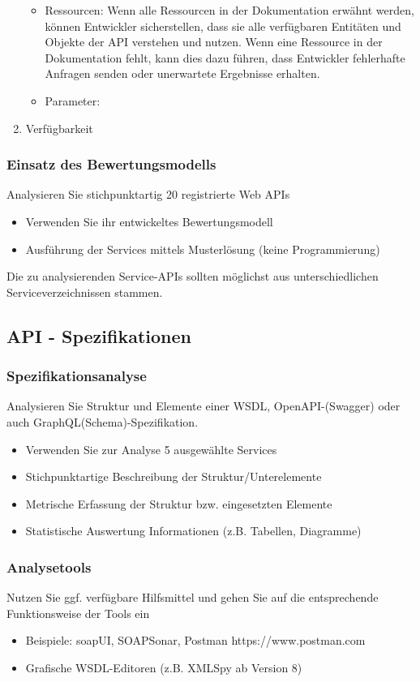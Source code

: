 \documentclass[notitlepage, hidelinks]{article}
\begin{document}
\begin{enumerate}
\begin{itemize}
\item Ressourcen: Wenn alle Ressourcen in der Dokumentation erwähnt werden, können Entwickler sicherstellen, dass sie alle verfügbaren Entitäten und Objekte der API verstehen und nutzen. Wenn eine Ressource in der Dokumentation fehlt, kann dies dazu führen, dass Entwickler fehlerhafte Anfragen senden oder unerwartete Ergebnisse erhalten.
\item Parameter: 
\end{itemize}
\item Verfügbarkeit
\end{enumerate}


\subsubsection{Einsatz des Bewertungsmodells}
Analysieren Sie stichpunktartig 20 registrierte Web APIs
\begin{itemize}
\item Verwenden Sie ihr entwickeltes Bewertungsmodell
\item Ausführung der Services mittels Musterlösung (keine Programmierung)
\end{itemize}
Die zu analysierenden Service-APIs sollten möglichst aus unterschiedlichen Serviceverzeichnissen stammen.

\subsection{API - Spezifikationen}
\subsubsection{Spezifikationsanalyse}
Analysieren Sie Struktur und Elemente einer WSDL, OpenAPI-(Swagger) oder auch GraphQL(Schema)-Spezifikation.
\begin{itemize}
\item Verwenden Sie zur Analyse 5 ausgewählte Services
\item Stichpunktartige Beschreibung der Struktur/Unterelemente
\item Metrische Erfassung der Struktur bzw. eingesetzten Elemente
\item Statistische Auswertung Informationen (z.B. Tabellen, Diagramme)
\end{itemize}

\subsubsection{Analysetools}
Nutzen Sie ggf. verfügbare Hilfsmittel und gehen Sie auf die entsprechende Funktionsweise der Tools ein
\begin{itemize}
\item Beispiele: soapUI, SOAPSonar, Postman https://www.postman.com
\item Grafische WSDL-Editoren (z.B. XMLSpy ab Version 8)
\end{itemize}
\end{document}
